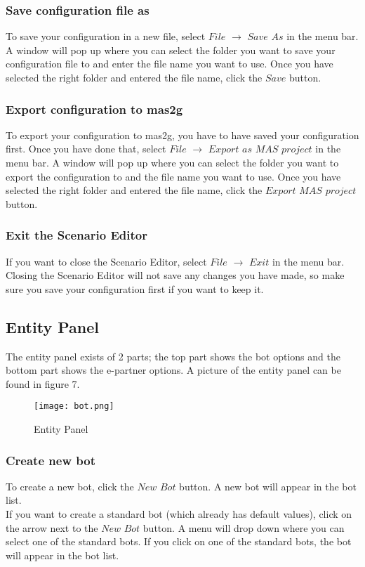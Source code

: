 \documentclass[11pt,a4paper]{article}
\begin{document}
\subsubsection{Save configuration file as}
To save your configuration in a new file, select $File$ $\to$ $Save$ $As$ in the menu bar. A window will pop up where you can select the folder you want to save your configuration file to and enter the file name you want to use. Once you have selected the right folder and entered the file name, click the $Save$ button.

\subsubsection{Export configuration to mas2g}
To export your configuration to mas2g, you have to have saved your configuration first. Once you have done that, select $File$ $\to$ $Export$ $as$ $MAS$ $project$ in the menu bar. A window will pop up where you can select the folder you want to export the configuration to and the file name you want to use. Once you have selected the right folder and entered the file name, click the $Export$ $MAS$ $project$ button.

\subsubsection{Exit the Scenario Editor}
If you want to close the Scenario Editor, select $File$ $\to$ $Exit$ in the menu bar. Closing the Scenario Editor will not save any changes you have made, so make sure you save your configuration first if you want to keep it.

\subsection{Entity Panel}
The entity panel exists of 2 parts; the top part shows the bot options and the bottom part shows the e-partner options. A picture of the entity panel can be found in figure 7.
\begin{figure}[h]
\begin{center}
\texttt{[image: bot.png]}
\end{center}
\caption{Entity Panel}
\end{figure}
\subsubsection{Create new bot}
To create a new bot, click the $New$ $Bot$ button. A new bot will appear in the bot list.\\
If you want to create a standard bot (which already has default values), click on the arrow next to the $New$ $Bot$ button. A menu will drop down where you can select one of the standard bots. If you click on one of the standard bots, the bot will appear in the bot list.
\end{document}
